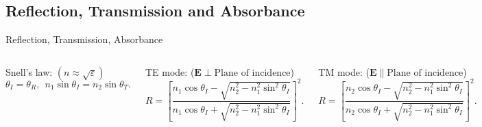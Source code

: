 \subsection{Reflection, Transmission and Absorbance}

\begin{frame}{Reflection, Transmission, Absorbance}
    \begin{columns}
        \vspace{-2mm}
        Snell's law: \( ( n \approx \sqrt{\varepsilon} )\)
        \begin{equation*}
            \theta_I = \theta_R, \ \ n_1 \sin \theta_I = n_2 \sin \theta_T.
        \end{equation*}
        
        TE mode: (\(\mathbf{E} \perp \text{Plane of incidence} \)) 
        \begin{equation*}
                R = \left[ \dfrac{ n_1 \cos \theta_I - \sqrt{ n_2^2 - n_1^2 \sin^2 \theta_I} }{ n_1 \cos \theta_I + \sqrt{n_2^2 - n_1^2 \sin^2 \theta_I}} \right]^2.
        \end{equation*}

        TM mode: (\(\mathbf{E} \parallel \text{Plane of incidence} \)) 
        \begin{equation*}
                R = \left[ \dfrac{ n_2 \cos \theta_I - \sqrt{ n_2^2 - n_1^2 \sin^2 \theta_I} }{ n_2 \cos \theta_I + \sqrt{n_2^2 - n_1^2 \sin^2 \theta_I}} \right]^2.
        \end{equation*}


\end{columns}
\end{frame}
